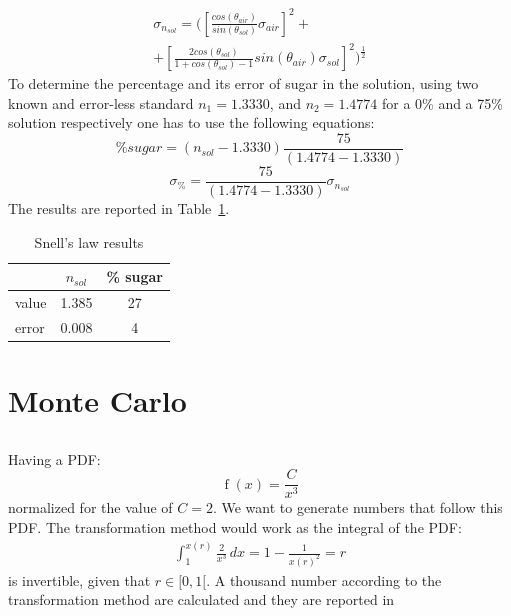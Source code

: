 \documentclass[twocolumn]{article}
\begin{document}
	\begin{multline}
	\sigma_{n_{sol}} = (\left[\frac{cos(\theta_{air})}{sin(\theta_{sol})}  \sigma_{air} \right]^2 + \\
	+ \left[ \frac{2 cos(\theta_{sol})}{1+cos(\theta_{sol})-1}  sin(\theta_{air}) \sigma_{sol}  \right] ^2 )^{\frac{1}{2}}
	\end{multline} 
	To determine the percentage and its error of sugar in the solution, using two known and error-less standard $n_1 = 1.3330$, and $n_2 = 1.4774$ for a  0\% and a 75\% solution respectively one has to use the following equations:
	\begin{equation}
	\% sugar = ( n_{sol} - 1.3330) \frac{75}{ (1.4774- 1.3330)}
	\end{equation}
	\begin{equation}
		\sigma_{\%} = \frac{75}{ (1.4774- 1.3330)} \sigma_{n_{sol}}
	\end{equation}
	The results are reported in Table~\ref{tab:snell}.
	\begin{table}[h!]
		\caption{Snell's law results}
		\label{tab:snell}
		\begin{center}
			\begin{tabular}{l|cc}
			\hline

			\hline
			\textbf{} & \textbf {$n_{sol}$ } & \textbf{ \% sugar} \\
			\hline
				value & 1.385  & 27 \\
				error & 0.008 & 4 \\
			\hline

			\hline
			\end{tabular}
		\end{center}
	\end{table}

\section{Monte Carlo} %
\label{sec:monte_carlo}
\subsection{}
 Having a PDF:
 \begin{equation}
 \label{eq:mcpdf}
 	\operatorname{f}{\left (x \right )} = \frac{C}{x^{3}}
 \end{equation}
 normalized for the value of $C=2$.
 We want to generate numbers that follow this PDF. 
 The transformation method would  work as the integral of the PDF:
 \begin{multline}
 	\int_{1}^{x(r)} \frac{2}{x^{3}}\, dx = 1 - \frac{1}{x(r)^{2}} = r
 \end{multline}
	is  invertible, given that $r \in [0,1[$. 
	A thousand number according to the transformation method are calculated and they are reported in 
\end{document}
